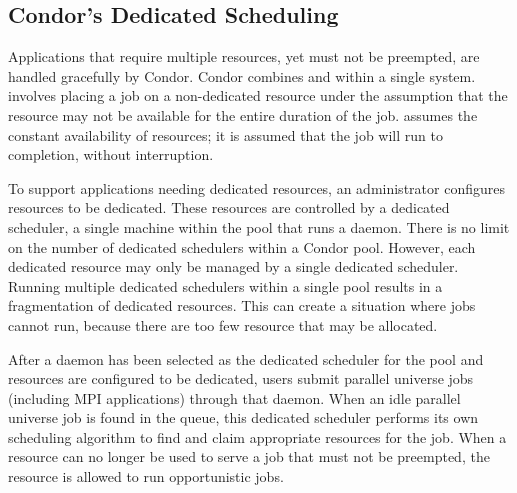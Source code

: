 \subsection{\label{sec:Config-Dedicated-Jobs}
Condor's Dedicated Scheduling} 


Applications that require multiple resources,
yet must not be preempted, are handled gracefully by Condor.
Condor combines
 and  within
a single system.
 involves placing a job on a non-dedicated
resource under the assumption that the resource may not be
available for the entire duration of the job.
 assumes the constant availability of
resources;
it is assumed that the job will run to completion,
without interruption.

To support applications needing dedicated resources,
an administrator 
configures resources to be dedicated.
These resources are controlled by a dedicated scheduler, a
single machine within the pool that runs a  daemon.
There is no limit on the number of dedicated schedulers within
a Condor pool.
However, each dedicated resource may only be managed by a single
dedicated scheduler.
Running multiple dedicated schedulers within a single pool
results in a fragmentation of dedicated resources.
This can create a situation where jobs cannot run, because 
there are too few resource that may be allocated.

After a  daemon has been selected as the dedicated scheduler
for the pool and resources are configured to be
dedicated, users submit parallel universe jobs (including MPI applications)
through that  daemon.
When an idle parallel universe job is found in the queue,
this dedicated scheduler
performs its own scheduling algorithm to find and claim appropriate
resources for the job.
When a resource can no longer be used to serve a job that must
not be preempted, the resource is allowed to run opportunistic jobs.


